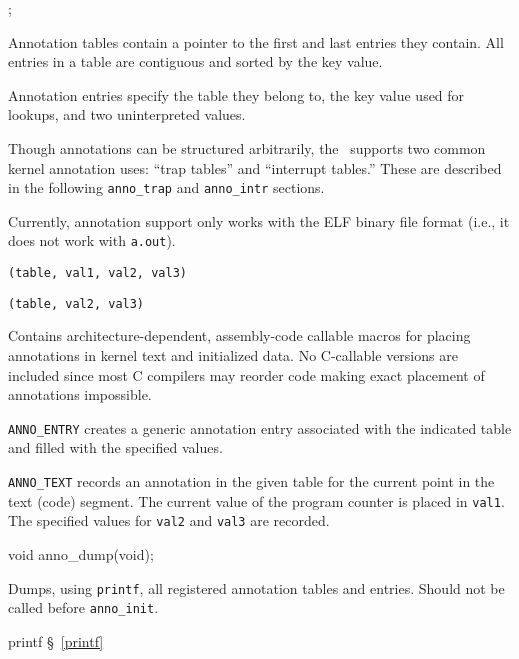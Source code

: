 ;

Annotation tables contain a pointer to the first and last entries they contain.
All entries in a table are contiguous and sorted by the key value.

Annotation entries specify the table they belong to,
the key value used for lookups, and two uninterpreted values.

Though annotations can be structured arbitrarily,
the \oskit\ supports two common kernel annotation uses:
``trap tables'' and ``interrupt tables.''
These are described in the following {\tt anno_trap} and {\tt anno_intr}
sections.

Currently, annotation support only works with the ELF binary file format
(i.e., it does not work with {\tt a.out}).

\begin{apisyn}

	{\tt {}(table, val1, val2, val3)}

	{\tt {}(table, val2, val3)}
\end{apisyn}
\begin{apidesc}
	Contains architecture-dependent, assembly-code callable macros for
	placing annotations in kernel text and initialized data.
	No C-callable versions are included since most C compilers may reorder
	code making exact placement of annotations impossible.

	{\tt ANNO_ENTRY}
	creates a generic annotation entry associated with the indicated table
	and filled with the specified values.

	{\tt ANNO_TEXT}
	records an annotation in the given table for the current point in the
	text (code) segment.
	The current value of the program counter is placed in {\tt val1}.
	The specified values for {\tt val2} and {\tt val3} are recorded.
\end{apidesc}

\label{anno-dump}
\begin{apisyn}

	\funcproto void anno_dump(void);
\end{apisyn}
\begin{apidesc}
	Dumps, using {\tt printf}, all registered annotation tables and entries.
	Should not be called before {\tt anno_init}.
\end{apidesc}
\begin{apidep}
	\item[printf]			\S~\ref{printf}
\end{apidep}

